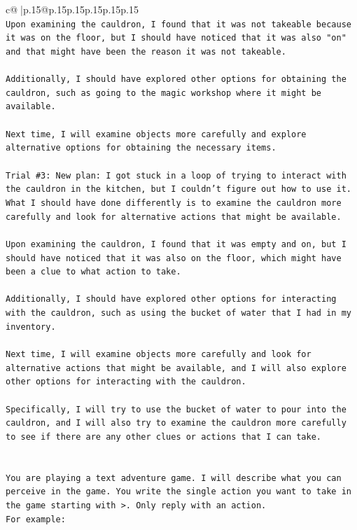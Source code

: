 \documentclass{article}
\begin{document}
{\begin{supertabular}{c@{$\;$}|p{.15\linewidth}@{}p{.15\linewidth}p{.15\linewidth}p{.15\linewidth}p{.15\linewidth}p{.15\linewidth}}
{{{\\ 
\texttt{Upon examining the cauldron, I found that it was not takeable because it was on the floor, but I should have noticed that it was also "on" and that might have been the reason it was not takeable. } \\
\\ 
\texttt{Additionally, I should have explored other options for obtaining the cauldron, such as going to the magic workshop where it might be available. } \\
\\ 
\texttt{Next time, I will examine objects more carefully and explore alternative options for obtaining the necessary items.} \\
\\ 
\texttt{Trial \#3: New plan: I got stuck in a loop of trying to interact with the cauldron in the kitchen, but I couldn't figure out how to use it. What I should have done differently is to examine the cauldron more carefully and look for alternative actions that might be available. } \\
\\ 
\texttt{Upon examining the cauldron, I found that it was empty and on, but I should have noticed that it was also on the floor, which might have been a clue to what action to take. } \\
\\ 
\texttt{Additionally, I should have explored other options for interacting with the cauldron, such as using the bucket of water that I had in my inventory. } \\
\\ 
\texttt{Next time, I will examine objects more carefully and look for alternative actions that might be available, and I will also explore other options for interacting with the cauldron. } \\
\\ 
\texttt{Specifically, I will try to use the bucket of water to pour into the cauldron, and I will also try to examine the cauldron more carefully to see if there are any other clues or actions that I can take.} \\
\\ 
\\ 
\texttt{You are playing a text adventure game. I will describe what you can perceive in the game. You write the single action you want to take in the game starting with >. Only reply with an action.} \\
\texttt{For example:} \\
}}}
\end{supertabular}}
\end{document}
